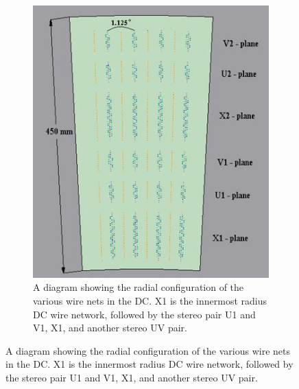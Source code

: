 \begin{figure}[p]
  \centering
\begin{subfigure}[p]{1\textwidth}
  \centering
    \includegraphics[width=1\textwidth]{Figures/dcdiagram.jpg}
  \caption{A diagram showing the radial configuration of the various wire nets in the DC. X1 is the innermost radius DC wire network, followed by the stereo pair U1 and V1, X1, and another stereo UV pair.}
  \label{fig:radialdcdiagram}
\end{subfigure}
\end{figure}
